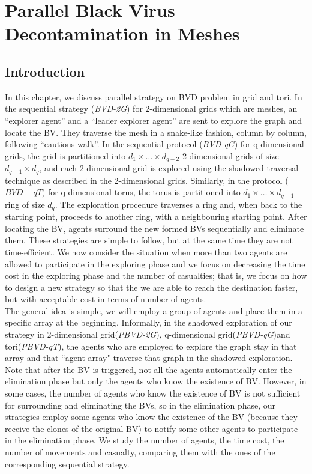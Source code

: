 \chapter {Parallel Black Virus Decontamination in Meshes}
\label{DL}
 
\section{Introduction}
In this chapter, we discuss parallel strategy on BVD problem in grid and tori. In the sequential strategy ({\em BVD-2G}) for 2-dimensional grids which are meshes, an ``explorer agent'' and a ``leader explorer agent'' are sent to explore the graph and locate the BV. They traverse the mesh in a snake-like fashion, column by column, following   ``cautious walk''. In the sequential protocol ({\em BVD-qG}) for q-dimensional grids, the grid is partitioned into $d_1\times\ldots\times d_{q-2}$ 2-dimensional grids of size $d_{q-1}\times d_q$, and each 2-dimensional grid is explored using the shadowed traversal technique as described in the 2-dimensional grids. Similarly, in the protocol ($BVD-qT$) for q-dimensional torus, the torus is partitioned into $d_1\times \ldots \times d_{q-1}$ ring of size $d_q$. The exploration procedure traverses a ring and, when back to the starting point, proceeds to another ring, with a neighbouring starting point. After locating the BV, agents surround the new formed BVs sequentially and eliminate them. These strategies are simple to follow, but at the same time they are not time-efficient. We now consider the situation when  more than two agents are allowed to participate in the exploring phase and we focus on decreasing the time cost in the exploring phase and the number of casualties; that is, we focus on how to design a new strategy so that the we are able to reach the destination faster, but with acceptable cost in terms of number of agents.\\
The general idea is simple, we will employ a group of agents and place them in a specific array at the beginning. Informally, in the shadowed exploration of our strategy in 2-dimensional grid({\em PBVD-2G}), q-dimensional grid({\em PBVD-qG})and tori({\em PBVD-qT}), the agents who are employed to explore the graph stay in that array and that ``agent array"  traverse that graph in the shadowed exploration. Note that after the BV is triggered, not all the agents automatically enter the elimination phase but only the agents who know the existence of BV. However,  in some cases, the number of agents who know the existence of BV is not sufficient for surrounding and eliminating the BVs, so in the elimination phase, our strategies employ some agents who know  the existence of the BV (because they receive the clones of the original BV) to notify some other agents to participate in the elimination phase. 
We study the number of agents, the time cost, the number of movements and  casualty, comparing them with  the ones of the corresponding sequential strategy.

